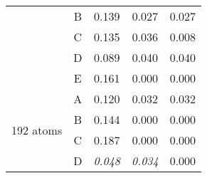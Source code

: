 \begin{table}[H]
\begin{tabular}{@{}ccccc@{}}
\multicolumn{1}{c|}{}                     & B          & 0.139                                                                         & 0.027                                                                         & 0.027                                                                          \\
\multicolumn{1}{c|}{}                     & C          & 0.135                                                                         & 0.036                                                                         & 0.008                                                                          \\
\multicolumn{1}{c|}{}                     & D          & 0.089                                                                         & 0.040                                                                         & 0.040                                                                          \\
\multicolumn{1}{c|}{}                     & E          & 0.161                                                                         & 0.000                                                                              & 0.000                                                                               \\ \midrule
\multicolumn{1}{c|}{\multirow{5}{*}{192 atoms}} & A          & 0.120                                                                         & 0.032                                                                         & 0.032                                                                          \\
\multicolumn{1}{c|}{}                     & B          & 0.144                                                                         & 0.000                                                                              & 0.000                                                                               \\
\multicolumn{1}{c|}{}                     & C          & 0.187                                                                         & 0.000                                                                              & 0.000                                                                               \\
\multicolumn{1}{c|}{}                     & D          & \textit{0.048}                                                                & \textit{0.034}                                                                         & 0.000                                                                               \\

\end{tabular}
\end{table}
